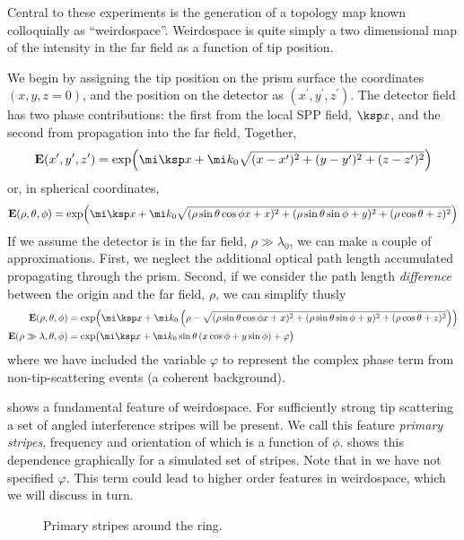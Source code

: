 Central to these experiments is the generation of a topology map known
colloquially as ``weirdospace''.  Weirdospace is quite simply a two
dimensional map of the intensity in the far field as a function of tip position.

We begin by assigning the tip position on the prism surface the coordinates
$(x,y,z=0)$, and the position on the detector as
$(x^\prime,y^\prime,z^\prime)$.  The detector field has two phase
contributions: the first from the local SPP field, $\ksp x$, and the second
from propagation into the far field, Together,
\begin{equation}
\mathbf{E}(x^\prime,y^\prime,z^\prime) = \exp\!\left( \mi\ksp x + %
\mi k_0\sqrt{ (x-x^\prime)^2+ (y-y^\prime)^2+ (z-z^\prime)^2 } \right)
\end{equation}
or, in spherical coordinates,
\begin{equation}
\mathbf{E}(\rho,\theta,\phi) = \exp\!\left( \mi\ksp x + %
\mi k_0\sqrt{
(\rho\sin\theta\cos\phi x+x)^2+(\rho\sin\theta\sin\phi+y)^2+(\rho\cos\theta+z)^2 } \right)
\label{eqn:dingusthusly}
\end{equation}
If we assume the detector is in the far field, $\rho\gg\lambda_0$, we can
make a couple of approximations.  First, we neglect the additional optical
path length accumulated propagating through the prism.  Second, if we
consider the path length \textit{difference} between the origin and the far field,
$\rho$, we can simplify  thusly
\begin{align}
\mathbf{E}(\rho,\theta,\phi) &= \exp\!\left( \mi\ksp x + %
\mi k_0\left(\rho-\sqrt{ (\rho\sin\theta\cos\phi x+x)^2+(\rho\sin\theta\sin\phi+y)^2+(\rho\cos\theta+z)^2
}\right) \right)\\
\mathbf{E}(\rho\gg\lambda,\theta,\phi) &= \exp\!\big( \mi \ksp x
 + \mi k_0 \sin\theta \left(x\cos\phi+y\sin\phi\right)
 + \varphi\big)
	\label{eqn:primarystripes}
\end{align}
where we have included the variable $\varphi$ to represent the complex phase term
from non-tip-scattering events (a coherent background).

 shows a fundamental feature of weirdospace.
For sufficiently strong tip scattering a set of angled interference stripes
will be present.  We call this feature \textit{primary stripes},
frequency and orientation of which is a function of $\phi$.
 shows this
dependence graphically for a simulated set of stripes.  Note that in
 we have not specified $\varphi$.  This term
could lead to higher order features in weirdospace, which we will discuss
in turn.
\begin{figure}
\centering
\caption{Primary stripes around the ring.}
\label{fig:primarystripes}
\end{figure}
